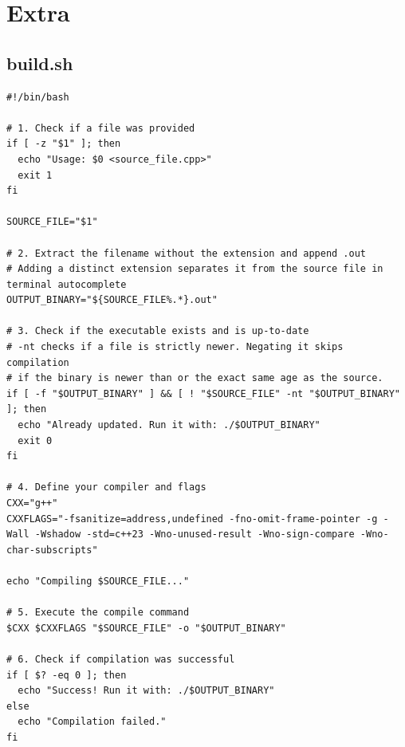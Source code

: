 \documentclass[11pt, a4paper, twoside]{article}
\begin{document}
\pagebreak


%
%

\section{Extra}

\subsection{build.sh}
\begin{lstlisting}
#!/bin/bash

# 1. Check if a file was provided
if [ -z "$1" ]; then
  echo "Usage: $0 <source_file.cpp>"
  exit 1
fi

SOURCE_FILE="$1"

# 2. Extract the filename without the extension and append .out
# Adding a distinct extension separates it from the source file in terminal autocomplete
OUTPUT_BINARY="${SOURCE_FILE%.*}.out"

# 3. Check if the executable exists and is up-to-date
# -nt checks if a file is strictly newer. Negating it skips compilation 
# if the binary is newer than or the exact same age as the source.
if [ -f "$OUTPUT_BINARY" ] && [ ! "$SOURCE_FILE" -nt "$OUTPUT_BINARY" ]; then
  echo "Already updated. Run it with: ./$OUTPUT_BINARY"
  exit 0
fi

# 4. Define your compiler and flags
CXX="g++"
CXXFLAGS="-fsanitize=address,undefined -fno-omit-frame-pointer -g -Wall -Wshadow -std=c++23 -Wno-unused-result -Wno-sign-compare -Wno-char-subscripts"

echo "Compiling $SOURCE_FILE..."

# 5. Execute the compile command
$CXX $CXXFLAGS "$SOURCE_FILE" -o "$OUTPUT_BINARY"

# 6. Check if compilation was successful
if [ $? -eq 0 ]; then
  echo "Success! Run it with: ./$OUTPUT_BINARY"
else
  echo "Compilation failed."
fi
\end{lstlisting}
\end{document}

